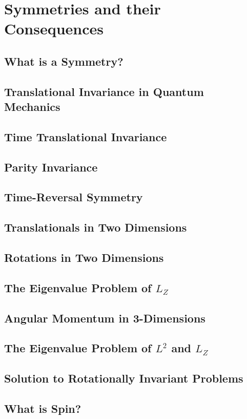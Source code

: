 \chapter{Symmetries and their Consequences}
\section{What is a Symmetry?}

\section{Translational Invariance in Quantum Mechanics}
\section{Time Translational Invariance}
\section{Parity Invariance}
\section{Time-Reversal Symmetry}
\section{Translationals in Two Dimensions}
\section{Rotations in Two Dimensions}
\section{The Eigenvalue Problem of $L_{Z}$}
\section{Angular Momentum in 3-Dimensions}
\section{The Eigenvalue Problem of $L^{2}$ and $L_{Z}$}
\section{Solution to Rotationally Invariant Problems}
\newpage
\section{What is Spin?}
